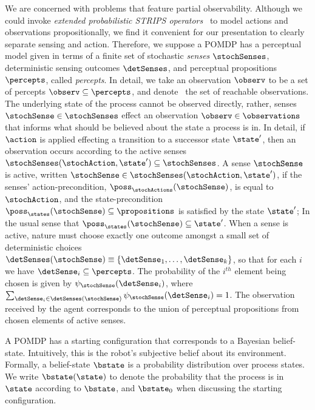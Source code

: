 
We are concerned with problems that feature partial
observability. Although we could invoke {\em extended probabilistic
STRIPS operators}~\cite{rintanen:01} to model actions and observations
propositionally, we find it convenient for our presentation to clearly
separate sensing and action. Therefore, we suppose a POMDP has a
perceptual model given in terms of a finite set of stochastic {\em
senses} $\stochSenses$, deterministic sensing outcomes $\detSenses$,
and perceptual propositions $\percepts$, called {\em percepts}. In
detail, we take an observation $\observ$ to be a set of percepts
$\observ \subseteq \percepts$, and denote \observations\ the set of
reachable observations. The underlying state of the process cannot be
observed directly, rather, senses $\stochSense \in \stochSenses$
effect an observation $\observ \in
\observations$ that informs what should be believed about the state a
process is in. In detail, if $\action$ is applied effecting a
transition to a successor state $\state'$, then an observation occurs
according to the active senses $\stochSenses(\stochAction, \state')
\subseteq \stochSenses$. A sense $\stochSense$ is active, written
$\stochSense \in \stochSenses(\stochAction, \state')$, if the senses'
action-precondition, $\poss_\stochActions(\stochSense)$, is equal to
$\stochAction$, and the state-precondition $\poss_\states(\stochSense)
\subseteq \propositions$ is satisfied by the state $\state'$; In the
usual sense that $\poss_\states(\stochSense) \subseteq \state'$.
When a sense is active, nature must choose exactly one outcome amongst
a small set of deterministic choices $\detSenses(\stochSense)
\equiv \{\detSense_1, \ldots, \detSense_k \}$, so that for each
$i$ we have $\detSense_i \subseteq \percepts$. The probability of
the $i^{th}$ element being chosen is given by
$\psi_{\stochSense}(\detSense_i)$, where $\sum_{\detSense_i \in
\detSenses(\stochSense)} \psi_{\stochSense}(\detSense_i) =
1$. The observation received by the agent corresponds to the union of
perceptual propositions from chosen elements of active
senses.

A POMDP has a starting configuration that corresponds to a Bayesian
belief-state. Intuitively, this is the robot's subjective belief about
its environment. Formally, a belief-state $\bstate$ is a probability
distribution over process states. We write $\bstate(\state)$ to denote
the probability that the process is in $\state$ according to
$\bstate$, and $\bstate_0$ when discussing the starting
configuration. 

